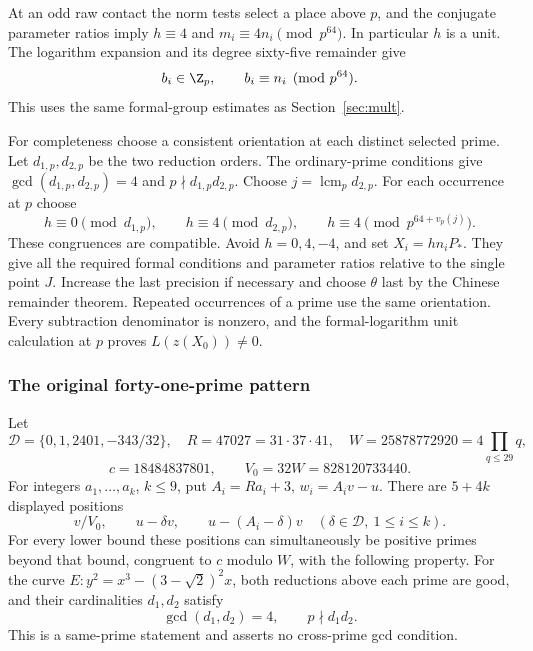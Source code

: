 At an odd raw contact the norm tests select a place above $p$, and
the conjugate parameter ratios imply
$h\equiv4$ and $m_i\equiv4n_i\pmod {p^{64}}$.
In particular $h$ is a unit. The logarithm expansion and its degree
sixty-five remainder give
\begin{equation}\label{eq:o8-proxies}
 b_i\in\Z_p,\qquad b_i\equiv n_i\pmod {p^{64}}.
\end{equation}
This uses the same formal-group estimates as Section~\ref{sec:mult}.

For completeness choose a consistent orientation at each distinct
selected prime. Let $d_{1,p},d_{2,p}$ be the two reduction orders.
The ordinary-prime conditions give $\gcd(d_{1,p},d_{2,p})=4$ and
$p\nmid d_{1,p}d_{2,p}$. Choose
$j=\operatorname{lcm}_p d_{2,p}$. For each occurrence at $p$ choose
\[
 h\equiv0\pmod {d_{1,p}},\qquad
 h\equiv4\pmod {d_{2,p}},\qquad
 h\equiv4\pmod {p^{64+v_p(j)}}.
\]
These congruences are compatible. Avoid $h=0,4,-4$, and set
$X_i=hn_iP_*$. They give all the required formal conditions and
parameter ratios relative to the single point $J$. Increase the last
precision if necessary and choose $\theta$ last by the Chinese
remainder theorem. Repeated occurrences of a prime use the same
orientation. Every subtraction denominator is nonzero, and the
formal-logarithm unit calculation at $p$ proves $L(z(X_0))\ne0$.

\subsubsection{The original forty-one-prime pattern}\label{subsec:o8-pattern-proof}
Let
\[
 \mathcal D=\{0,1,2401,-343/32\},\quad R=47027=31\cdot37\cdot41,
 \quad W=25878772920=4\prod_{q\le29}q,
\]
\[
 c=18484837801,\qquad V_0=32W=828120733440.
\]
For integers $a_1,\ldots,a_k$, $k\le9$, put $A_i=Ra_i+3$,
$w_i=A_iv-u$. There are $5+4k$ displayed positions
\begin{equation}\label{eq:old41-list}
 v/V_0,\qquad u-\delta v,\qquad
 u-(A_i-\delta)v\quad(\delta\in\mathcal D,\ 1\le i\le k).
\end{equation}
For every lower bound these positions can simultaneously be positive
primes beyond that bound, congruent to $c$ modulo $W$, with the
following property. For the curve
$E:y^2=x^3-(3-\sqrt2)^2x$, both reductions above each prime are good,
and their cardinalities $d_1,d_2$ satisfy
\[
 \gcd(d_1,d_2)=4,\qquad p\nmid d_1d_2.
\]
This is a same-prime statement and asserts no cross-prime gcd condition.

